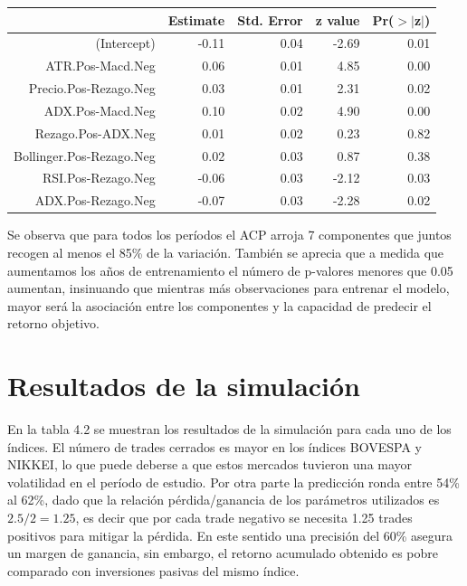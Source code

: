 \documentclass[a4paper,12pt]{Latex/Classes/PhDthesisPSnPDF}
\begin{document}
\newpage
\begin{center}
\begin{table}[ht]
\centering
\begin{tabular}{rrrrr}
  \hline
 & Estimate & Std. Error & z value & Pr($>$$|$z$|$) \\ 
  \hline
(Intercept) & -0.11 & 0.04 & -2.69 & 0.01 \\ 
  ATR.Pos-Macd.Neg & 0.06 & 0.01 & 4.85 & 0.00 \\ 
  Precio.Pos-Rezago.Neg & 0.03 & 0.01 & 2.31 & 0.02 \\ 
  ADX.Pos-Macd.Neg & 0.10 & 0.02 & 4.90 & 0.00 \\ 
  Rezago.Pos-ADX.Neg & 0.01 & 0.02 & 0.23 & 0.82 \\ 
  Bollinger.Pos-Rezago.Neg & 0.02 & 0.03 & 0.87 & 0.38 \\ 
  RSI.Pos-Rezago.Neg & -0.06 & 0.03 & -2.12 & 0.03 \\ 
  ADX.Pos-Rezago.Neg & -0.07 & 0.03 & -2.28 & 0.02 \\ 
   \hline
\end{tabular}
\end{table}\end{center}

Se observa que para todos los períodos el ACP arroja 7 componentes que juntos recogen al menos el 85\% de la variación. También se aprecia que a medida que aumentamos los años de entrenamiento el número de p-valores menores que 0.05 aumentan, insinuando que mientras más observaciones para entrenar el modelo, mayor será la asociación entre los componentes y la capacidad de predecir el retorno objetivo.

\section{Resultados de la simulación}


En la tabla 4.2 se muestran los resultados de la simulación para cada uno de los índices. El número de trades cerrados es mayor en los índices BOVESPA y NIKKEI, lo que puede deberse a que estos mercados tuvieron una mayor volatilidad en el período de estudio. Por otra parte la predicción ronda entre 54\% al 62\%, dado que la relación pérdida/ganancia de los parámetros utilizados es $2.5/2 = 1.25$, es decir que por cada trade negativo se necesita 1.25 trades positivos para mitigar la pérdida. En este sentido una precisión del 60\% asegura un margen de ganancia, sin embargo, el retorno acumulado obtenido es pobre comparado con inversiones pasivas del mismo índice. 
\end{document}
